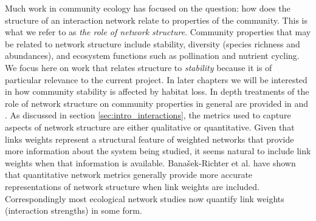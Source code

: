 Much work in community ecology has focused on the question: how does the structure of an interaction network relate to properties of the community. This is what we refer to as \emph{the role of network structure}. Community properties that may be related to network structure include stability, diversity (species richness and abundances), and ecosystem functions such as pollination and nutrient cycling. We focus here on work that relates structure to \emph{stability} because it is of particular relevance to the current project. In later chapters we will be interested in how community stability is affected by habitat loss. In depth treatments of the role of network structure on community properties in general are provided in \cite{thompson2012food} and \cite{rooney2012integrating}. As discussed in section \ref{sec:intro_interactions}, the metrics used to capture aspects of network structure are either qualitative or quantitative. Given that links weights represent a structural feature of weighted networks that provide more information about the system being studied, it seems natural to include link weights when that information is available. Bana{\v{s}}ek-Richter et al. \cite{banavsek2004sampling} have shown that quantitative network metrics generally provide more accurate representations of network structure when link weights are included. Correspondingly most ecological network studies now quantify link weights (interaction strengths) in some form.


